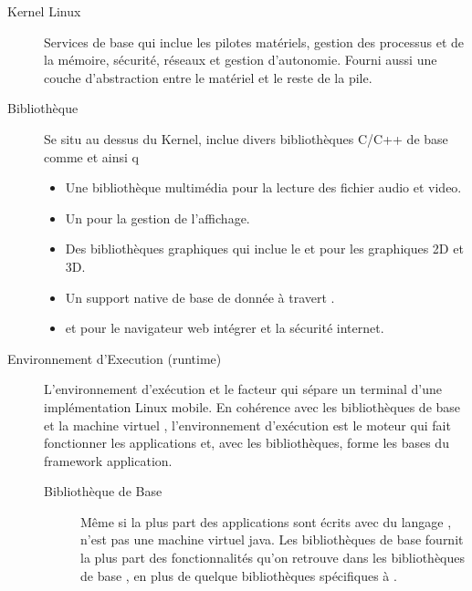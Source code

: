\begin{description}

\item [Kernel Linux]
Services de base qui inclue les pilotes matériels, gestion des processus et de la mémoire, sécurité, réseaux et gestion d'autonomie. Fourni aussi une couche d'abstraction entre le matériel et le reste de la pile.

\item [Bibliothèque]
Se situ au dessus du Kernel, \android{} inclue divers bibliothèques C/C++ de base comme  et  ainsi q
\begin{itemize}

\item Une bibliothèque multimédia pour la lecture des fichier audio et video.

\item Un  pour la gestion de l'affichage.

\item Des bibliothèques graphiques qui inclue le  et  pour les graphiques 2D et 3D.

\item Un support native de base de donnée à travert .

\item {} et  pour le navigateur web intégrer et la sécurité internet.

\end{itemize}

\item [Environnement d'Execution (runtime) \android{}]

L'environnement d’exécution et le facteur qui sépare un terminal \android{}
d'une implémentation Linux mobile. En cohérence avec les bibliothèques de base
et la machine virtuel , l'environnement d’exécution \android{} est
le moteur qui fait fonctionner les applications et, avec les bibliothèques,
forme les bases du framework application.

\begin{description}

\item [Bibliothèque de Base]

Même si la plus part des applications \android{} sont écrits avec du langage
,  n'est pas une machine virtuel java. Les bibliothèques
\android{} de base fournit la plus part des fonctionnalités qu'on retrouve
dans les bibliothèques de base , en plus de quelque bibliothèques
spécifiques à \android{}.


\end{description}
\end{description}
